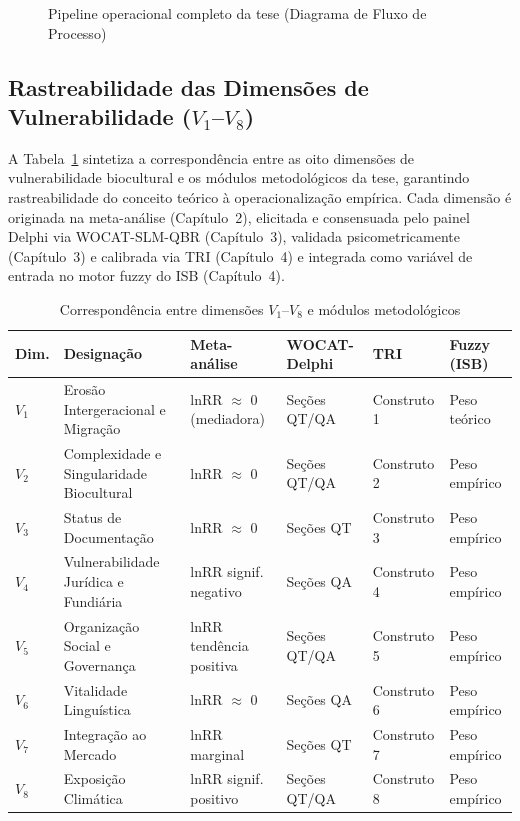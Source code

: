 \begin{figure}[H]
  \centering
  \caption{Pipeline operacional completo da tese (Diagrama de Fluxo de Processo)}
  \resizebox{\textwidth}{!}{%
  }
  \label{fig:pipeline_operacional}
\end{figure}

\subsection{Rastreabilidade das Dimensões de Vulnerabilidade ($V_1$--$V_8$)}

A Tabela~\ref{tab:reconciliacao_v} sintetiza a correspondência entre as oito dimensões de vulnerabilidade biocultural e os módulos metodológicos da tese, garantindo rastreabilidade do conceito teórico à operacionalização empírica. Cada dimensão é originada na meta-análise (Capítulo~2), elicitada e consensuada pelo painel Delphi via WOCAT-SLM-QBR (Capítulo~3), validada psicometricamente (Capítulo~3) e calibrada via TRI (Capítulo~4) e integrada como variável de entrada no motor fuzzy do ISB (Capítulo~4).

\begin{table}[H]
\centering
\caption{Correspondência entre dimensões $V_1$--$V_8$ e módulos metodológicos}\label{tab:reconciliacao_v}
\footnotesize
\begin{tabular}{@{}llllll@{}}
\toprule
\textbf{Dim.} & \textbf{Designação} & \textbf{Meta-análise} & \textbf{WOCAT-Delphi} & \textbf{TRI} & \textbf{Fuzzy (ISB)} \\
\midrule
$V_1$ & Erosão Intergeracional e Migração & lnRR $\approx$ 0 (mediadora) & Seções QT/QA & Construto 1 & Peso teórico \\
$V_2$ & Complexidade e Singularidade Biocultural & lnRR $\approx$ 0 & Seções QT/QA & Construto 2 & Peso empírico \\
$V_3$ & Status de Documentação & lnRR $\approx$ 0 & Seções QT & Construto 3 & Peso empírico \\
$V_4$ & Vulnerabilidade Jurídica e Fundiária & lnRR signif. negativo & Seções QA & Construto 4 & Peso empírico \\
$V_5$ & Organização Social e Governança & lnRR tendência positiva & Seções QT/QA & Construto 5 & Peso empírico \\
$V_6$ & Vitalidade Linguística & lnRR $\approx$ 0 & Seções QA & Construto 6 & Peso empírico \\
$V_7$ & Integração ao Mercado & lnRR marginal & Seções QT & Construto 7 & Peso empírico \\
$V_8$ & Exposição Climática & lnRR signif. positivo & Seções QT/QA & Construto 8 & Peso empírico \\
\bottomrule
\end{tabular}
\end{table}

